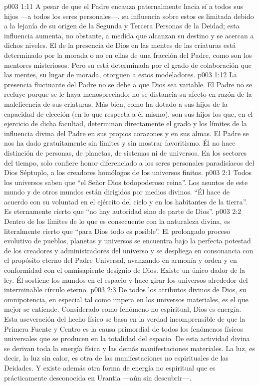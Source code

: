 \vs p003 1:11 \pc A pesar de que el Padre encauza paternalmente hacia sí a todos sus hijos ---a todos los seres personales---, su influencia sobre estos es limitada debido a la lejanía de su origen de la Segunda y Tercera Personas de la Deidad; esta influencia aumenta, no obstante, a medida que alcanzan su destino y se acercan a dichos niveles. El  de la presencia de Dios en las mentes de las criaturas está determinado por la morada o no en ellas de una fracción del Padre, como son los mentores misteriosos. Pero su  está determinada por el grado de colaboración que las mentes, su lugar de morada, otorguen a estos modeladores.
\vs p003 1:12 La presencia fluctuante del Padre no se debe a que Dios sea variable. El Padre no se recluye porque se le haya menospreciado; no se distancia su afecto en razón de la maleficencia de sus criaturas. Más bien, como ha dotado a sus hijos de la capacidad de elección (en lo que respecta a él mismo), son sus hijos los que, en el ejercicio de dicha facultad, determinan directamente el grado y los límites de la influencia divina del Padre en sus propios corazones y en sus almas. El Padre se nos ha dado gratuitamente sin límites y sin mostrar favoritismo. Él no hace distinción de personas, de planetas, de sistemas ni de universos. En los sectores del tiempo, solo confiere honor diferenciado a los seres personales paradisíacos del Dios Séptuplo, a los creadores homólogos de los universos finitos.
\vs p003 2:1 Todos los universos saben que “el Señor Dios todopoderoso reina”. Los asuntos de este mundo y de otros mundos están dirigidos por medios divinos. “Él hace de acuerdo con su voluntad en el ejército del cielo y en los habitantes de la tierra”. Es eternamente cierto que “no hay autoridad sino de parte de Dios”.
\vs p003 2:2 Dentro de los límites de lo que es consecuente con la naturaleza divina, es literalmente cierto que “para Dios todo es posible”. El prolongado proceso evolutivo de pueblos, planetas y universos se encuentra bajo la perfecta potestad de los creadores y administradores del universo y se despliega en consonancia con el propósito eterno del Padre Universal, avanzando en armonía y orden y en conformidad con el omnisapiente designio de Dios. Existe un único dador de la ley. Él sostiene los mundos en el espacio y hace girar los universos alrededor del interminable círculo eterno.
\vs p003 2:3 De todos los atributos divinos de Dios, su omnipotencia, en especial tal como impera en los universos materiales, es el que mejor se entiende. Considerado como fenómeno no espiritual, Dios es energía. Esta aseveración del hecho físico se basa en la verdad incomprensible de que la Primera Fuente y Centro es la causa primordial de todos los fenómenos físicos universales que se producen en la totalidad del espacio. De esta actividad divina se derivan toda la energía física y las demás manifestaciones materiales. La luz, es decir, la luz sin calor, es otra de las manifestaciones no espirituales de las Deidades. Y existe además otra forma de energía no espiritual que es prácticamente desconocida en Urantia ---aún sin descubrir---.
